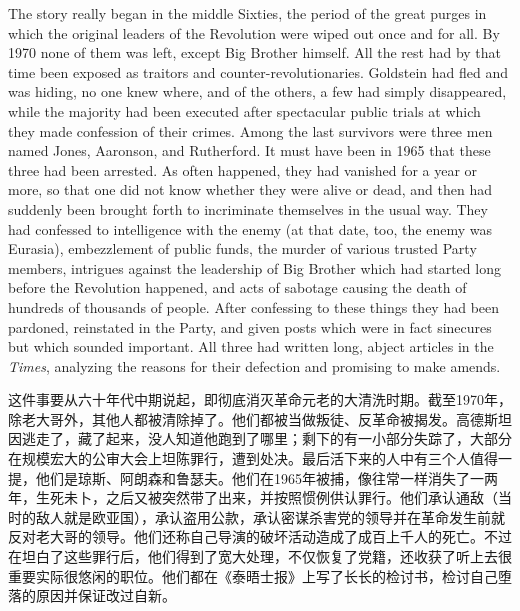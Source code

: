 \begin{paracol}{2}
\switchcolumn*

The story really began in the middle Sixties, the period of the great
purges in which the original leaders of the Revolution were wiped out
once and for all. By 1970 none of them was left, except Big Brother
himself. All the rest had by that time been exposed as traitors and
counter-revolutionaries. Goldstein had fled and was hiding, no one knew
where, and of the others, a few had simply disappeared, while the
majority had been executed after spectacular public trials at which they
made confession of their crimes. Among the last survivors were three men
named Jones, Aaronson, and Rutherford. It must have been in 1965 that
these three had been arrested. As often happened, they had vanished for
a year or more, so that one did not know whether they were alive or
dead, and then had suddenly been brought forth to incriminate themselves
in the usual way. They had confessed to intelligence with the enemy (at
that date, too, the enemy was Eurasia), embezzlement of public funds,
the murder of various trusted Party members, intrigues against the
leadership of Big Brother which had started long before the Revolution
happened, and acts of sabotage causing the death of hundreds of
thousands of people. After confessing to these things they had been
pardoned, reinstated in the Party, and given posts which were in fact
sinecures but which sounded important. All three had written long,
abject articles in the \emph{Times}, analyzing the reasons for their
defection and promising to make amends.

\switchcolumn

这件事要从六十年代中期说起，即彻底消灭革命元老的大清洗时期。截至1970年，除老大哥外，其他人都被清除掉了。他们都被当做叛徒、反革命被揭发。高德斯坦因逃走了，藏了起来，没人知道他跑到了哪里；剩下的有一小部分失踪了，大部分在规模宏大的公审大会上坦陈罪行，遭到处决。最后活下来的人中有三个人值得一提，他们是琼斯、阿朗森和鲁瑟夫。他们在1965年被捕，像往常一样消失了一两年，生死未卜，之后又被突然带了出来，并按照惯例供认罪行。他们承认通敌（当时的敌人就是欧亚国），承认盗用公款，承认密谋杀害党的领导并在革命发生前就反对老大哥的领导。他们还称自己导演的破坏活动造成了成百上千人的死亡。不过在坦白了这些罪行后，他们得到了宽大处理，不仅恢复了党籍，还收获了听上去很重要实际很悠闲的职位。他们都在《泰晤士报》上写了长长的检讨书，检讨自己堕落的原因并保证改过自新。

\switchcolumn*


\end{paracol}
